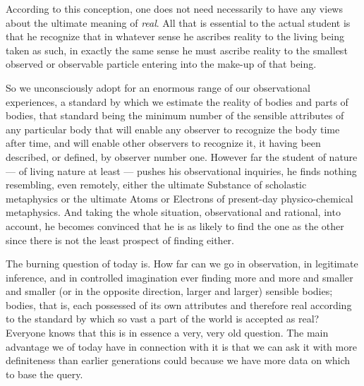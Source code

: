 \documentclass[a4paper, 11pt, oneside, polutonikogreek, english, landscape]{article}
\begin{document}
According to this conception, one does not need necessarily to have any views about the ultimate meaning of \emph{real}. All that is essential to the actual student is that he recognize that in whatever sense he ascribes reality to the living being taken as such, in exactly the same sense he must ascribe reality to the smallest observed or observable particle entering into the make-up of that being.

So we unconsciously adopt for an enormous range of our observational experiences, a standard by which we estimate the reality of bodies and parts of bodies, that standard being the minimum number of the sensible attributes of any particular body that will enable any observer to recognize the body time after time, and will enable other observers to recognize it, it having been described, or defined, by observer number one. However far the student of nature --- of living nature at least --- pushes his observational inquiries, he finds nothing resembling, even remotely, either the ultimate Substance of scholastic metaphysics or the ultimate Atoms or Electrons of present-day physico-chemical metaphysics. And taking the whole situation, observational and rational, into account, he becomes convinced that he is as likely to find the one as the other since there is not the least prospect of finding either.

The burning question of today is. How far can we go in observation, in legitimate inference, and in controlled imagination ever finding more and more and smaller and smaller (or in the opposite direction, larger and larger) sensible bodies; bodies, that is, each possessed of its own attributes and therefore real according to the standard by which so vast a part of the world is accepted as real? Everyone knows that this is in essence a very, very old question. The main advantage we of today have in connection with it is that we can ask it with more definiteness than earlier generations could because we have more data on which to base the query.

\subsection{}
\end{document}

